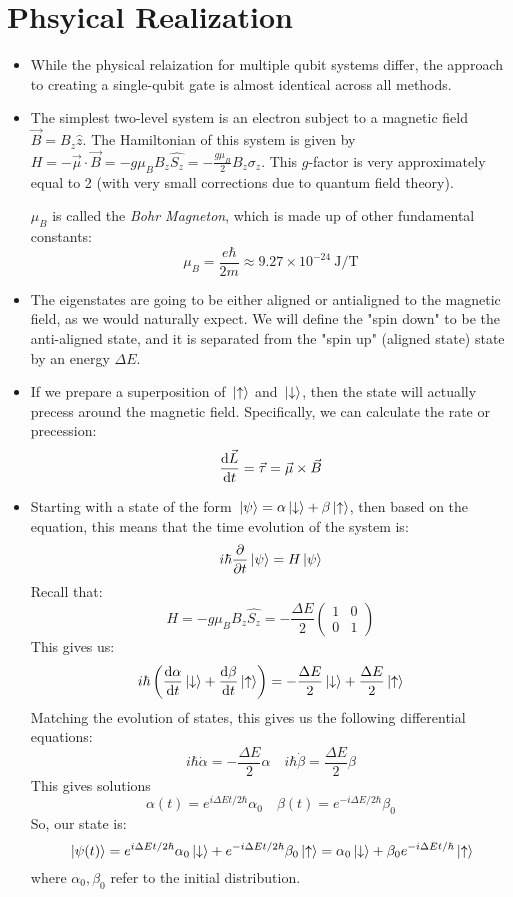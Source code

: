 \section{Phsyical Realization}
\begin{itemize}
	\item While the physical relaization for multiple qubit systems differ, the approach to creating a single-qubit 
		gate is almost identical across all methods. 
	\item The simplest two-level system is an electron subject to a magnetic field \( \vec B = B_z \hat{z} \). 
		The Hamiltonian of this system is given by \( H = - \vec \mu \cdot \vec B = -g \mu_B B_z 
		\hat{S_z} = -\frac{g \mu_B}{2}B_z \sigma_z\).  
		This \( g \)-factor is very approximately equal to 2 (with very small corrections due to quantum field 
		theory). 

		\( \mu_B \) is called the \textit{Bohr Magneton}, which is made up of other fundamental constants:
		\[
		\mu_B = \frac{e \hbar}{2m} \approx 9.27 \times 10^{-24} \mathrm{\ J / T}
		\] 
	\item The eigenstates are going to be either aligned or antialigned to the magnetic field, as we would 
		naturally expect. We will define the "spin down" to be the anti-aligned state, and it is separated from 
		the "spin up" (aligned state) state by an energy \( \Delta E \). 
	\item If we prepare a superposition of \( \ket*{\uparrow} \) and \( \ket*{\downarrow} \), then the state will 
		actually precess around the magnetic field. Specifically, we can calculate the rate or precession:
		\[
			\dv{\vec L}{t} = \vec \tau = \vec \mu \times \vec B
		\] 
	\item Starting with a state of the form \( \ket*{\psi} = \alpha \ket*{\downarrow} + \beta \ket*{\uparrow}\), 
		then based on the \schrodinger equation, this means that the time evolution of the system is:
		\[
			i \hbar \pdv{t} \ket*{\psi} = H \ket*{\psi}
		\] 
		Recall that:
		\[
			H = - g \mu_B B_z \hat{S_z} = -\frac{\Delta E}{2}\begin{pmatrix} 1 & 0\\0& 1 \end{pmatrix} 
		\] 
		This gives us:
		\[
			i\hbar \left( \dv{\alpha}{t} \ket*{\downarrow} + \dv{\beta}{t} \ket*{\uparrow}\right) 
			= -\frac{\Delta E}{2}\ket*{\downarrow} + \frac{\Delta E}{2}\ket*{\uparrow}
		\] 
		Matching the evolution of states, this gives us the following differential equations:
		\[
			i \hbar \dot \alpha = -\frac{\Delta E}{2} \alpha \quad
			i \hbar \dot \beta = \frac{\Delta E}{2}\beta
		\]
		This gives solutions
		\[
		\alpha(t) = e^{ i \Delta E t / 2 \hbar }\alpha_0 \quad \beta(t) = e^{-i \Delta E / 2 \hbar }\beta_0
		\] 
		So, our state is:
		\[
		\ket*{\psi(t)} = e^{i \Delta E t / 2\hbar} \alpha_0 \ket*{\downarrow} + e^{- i \Delta E t / 2\hbar}\beta_0
		\ket*{\uparrow} = \alpha_0 \ket*{\downarrow} + \beta_0 e^{-i \Delta E t / \hbar }\ket*{\uparrow}
		\] 
		where \( \alpha_0, \beta_0 \) refer to the initial distribution.
		

\end{itemize}
